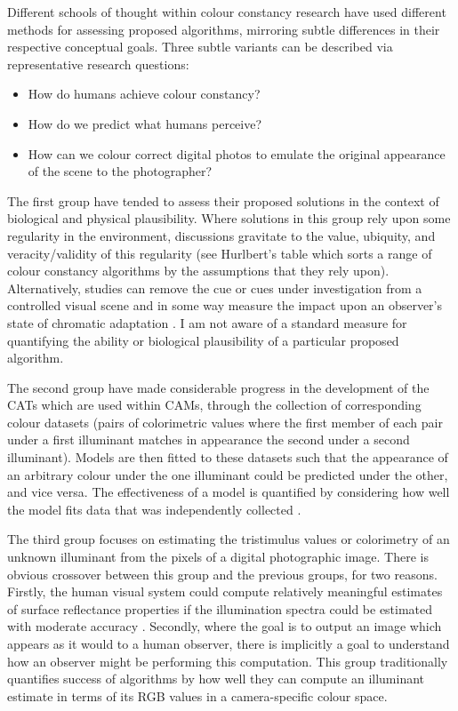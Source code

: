 Different schools of thought within colour constancy research have used different methods for assessing proposed algorithms, mirroring subtle differences in their respective conceptual goals. Three subtle variants can be described via representative research questions:

\begin{itemize}
\item{How do humans achieve colour constancy?}
\item{How do we predict what humans perceive?}
\item{How can we colour correct digital photos to emulate the original appearance of the scene to the photographer?}
\end{itemize}

The first group have tended to assess their proposed solutions in the context of biological and physical plausibility. Where solutions in this group rely upon some regularity in the environment, discussions gravitate to the value, ubiquity, and veracity/validity of this regularity (see Hurlbert's table \cite[p.~295]{hurlbert_computational_1998} which sorts a range of colour constancy algorithms by the assumptions that they rely upon). Alternatively, studies can remove the cue or cues under investigation from a controlled visual scene and in some way measure the impact upon an observer's state of chromatic adaptation \cite{kraft_mechanisms_1999}. I am not aware of a standard measure for quantifying the ability or biological plausibility of a particular proposed algorithm.

The second group have made considerable progress in the development of the \Glspl{CAT} which are used within \Glspl{CAM}, through the collection of corresponding colour datasets (pairs of colorimetric values where the first member of each pair under a first illuminant matches in appearance the second under a second illuminant). Models are then fitted to these datasets such that the appearance of an arbitrary colour under the one illuminant could be predicted under the other, and vice versa. The effectiveness of a model is quantified by considering how well the model fits data that was independently collected \cite{cie_tc_1-52_cie_2004}.

The third group focuses on estimating the tristimulus values or colorimetry of an unknown illuminant from the pixels of a digital photographic image. There is obvious crossover between this group and the previous groups, for two reasons.
Firstly, the human visual system could compute relatively meaningful estimates of surface reflectance properties if the illumination spectra could be estimated with moderate accuracy \cite{maloney_computational_1984}. Secondly, where the goal is to output an image which appears as it would to a human observer, there is implicitly a goal to understand how an observer might be performing this computation. This group traditionally quantifies success of algorithms by how well they can compute an illuminant estimate in terms of its RGB values in a camera-specific colour space.

